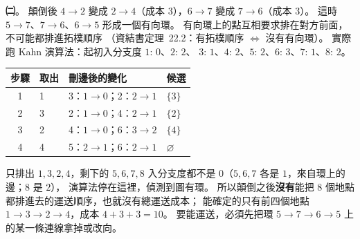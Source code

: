 \begin{pastsoln}
\textbf{㈡}。 顛倒後 $4 \to 2$ 變成 $2 \to 4$（成本 $3$），$6 \to 7$ 變成 $7 \to 6$（成本 $3$）。 這時
$5 \to 7$、$7 \to 6$、$6 \to 5$ 形成一個有向環。 有向環上的點互相要求排在對方前面，不可能都排進拓樸順序
（資結書定理~22.2：有拓樸順序 $\iff$ 沒有有向環）。 實際跑 Kahn 演算法：起初入分支度 $1{:}\,0$、$2{:}\,2$、
$3{:}\,1$、$4{:}\,2$、$5{:}\,2$、$6{:}\,3$、$7{:}\,1$、$8{:}\,2$。
\begin{center}
\small
\begin{tabular}{clll}
\toprule
步驟 & 取出 & 刪邊後的變化 & 候選 \\
\midrule
1 & 1 & 3：$1 \to 0$；2：$2 \to 1$ & $\{3\}$ \\
2 & 3 & 2：$1 \to 0$；4：$2 \to 1$ & $\{2\}$ \\
3 & 2 & 4：$1 \to 0$；6：$3 \to 2$ & $\{4\}$ \\
4 & 4 & 5：$2 \to 1$；6：$2 \to 1$ & $\varnothing$ \\
\bottomrule
\end{tabular}
\end{center}
只排出 $1, 3, 2, 4$，剩下的 $5, 6, 7, 8$ 入分支度都不是 $0$（$5, 6, 7$ 各是 $1$，來自環上的邊；$8$ 是 $2$），
演算法停在這裡，偵測到圖有環。 所以顛倒之後\textbf{沒有}能把 $8$ 個地點都排進去的運送順序，也就沒有總運送成本；
能確定的只有前四個地點 $1 \to 3 \to 2 \to 4$，成本 $4 + 3 + 3 = 10$。 要能運送，必須先把環 $5 \to 7 \to 6 \to 5$
上的某一條連線拿掉或改向。
\end{pastsoln}
